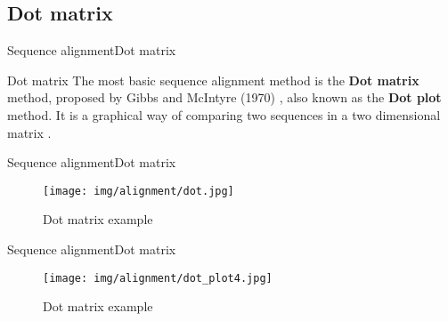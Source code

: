 \documentclass[10pt]{beamer}
\newcommand{\1}{
	\setbeamertemplate{background}{
		\texttt{[image: img/1]}
		\tikz[overlay] \fill[fill opacity=0.75,fill=white] (0,0) rectangle (-\paperwidth,\paperheight);
	}
}
\begin{document}
\subsection{Dot matrix}                                 %

\begin{frame}{Sequence alignment}{Dot matrix}

\begin{block}{Dot matrix}
\centering
The most basic sequence alignment method is the \textbf{Dot matrix} method, proposed by Gibbs and McIntyre (1970) \cite{gibbs1970diagram}, also known
as the \textbf{Dot plot} method. It is a graphical way of comparing two sequences in a two 
dimensional matrix \cite{xiong2006essential}.
\end{block}

\end{frame}

\begin{frame}{Sequence alignment}{Dot matrix}

\begin{figure}[]
 \centering
    \texttt{[image: img/alignment/dot.jpg]}
    \label{img:uniprot}
    \caption{Dot matrix example}
\end{figure}
\end{frame}

\begin{frame}{Sequence alignment}{Dot matrix}
	
	\begin{figure}[]
		\centering
		\texttt{[image: img/alignment/dot\_plot4.jpg]}
		\label{img:uniprot}
		\caption{Dot matrix example}
	\end{figure}
\end{frame}
\end{document}
